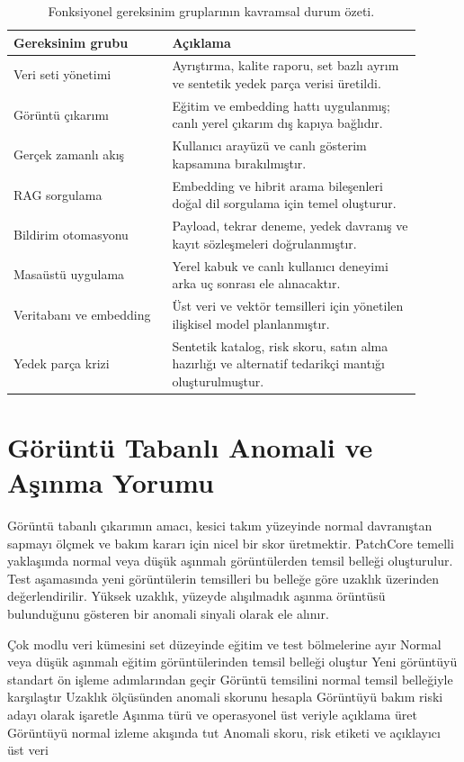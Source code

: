 \documentclass[conference]{IEEEtran}
\begin{document}
\begin{table}[H]
\centering
\caption{Fonksiyonel gereksinim gruplarının kavramsal durum özeti.}
\label{tab:reqstatus}
\begin{tabular}{p{0.35\linewidth}p{0.55\linewidth}}
\toprule
Gereksinim grubu & Açıklama \\
\midrule
Veri seti yönetimi & Ayrıştırma, kalite raporu, set bazlı ayrım ve sentetik yedek parça verisi üretildi. \\
Görüntü çıkarımı & Eğitim ve embedding hattı uygulanmış; canlı yerel çıkarım dış kapıya bağlıdır. \\
Gerçek zamanlı akış & Kullanıcı arayüzü ve canlı gösterim kapsamına bırakılmıştır. \\
RAG sorgulama & Embedding ve hibrit arama bileşenleri doğal dil sorgulama için temel oluşturur. \\
Bildirim otomasyonu & Payload, tekrar deneme, yedek davranış ve kayıt sözleşmeleri doğrulanmıştır. \\
Masaüstü uygulama & Yerel kabuk ve canlı kullanıcı deneyimi arka uç sonrası ele alınacaktır. \\
Veritabanı ve embedding & Üst veri ve vektör temsilleri için yönetilen ilişkisel model planlanmıştır. \\
Yedek parça krizi & Sentetik katalog, risk skoru, satın alma hazırlığı ve alternatif tedarikçi mantığı oluşturulmuştur. \\
\bottomrule
\end{tabular}
\end{table}

\section{Görüntü Tabanlı Anomali ve Aşınma Yorumu}
Görüntü tabanlı çıkarımın amacı, kesici takım yüzeyinde normal davranıştan sapmayı ölçmek ve bakım kararı için nicel bir skor üretmektir. PatchCore temelli yaklaşımda normal veya düşük aşınmalı görüntülerden temsil belleği oluşturulur. Test aşamasında yeni görüntülerin temsilleri bu belleğe göre uzaklık üzerinden değerlendirilir. Yüksek uzaklık, yüzeyde alışılmadık aşınma örüntüsü bulunduğunu gösteren bir anomali sinyali olarak ele alınır.

\begin{algorithm}[H]
\caption{Görüntü Tabanlı Anomali Değerlendirme Akışı}
\begin{algorithmic}[1]
\STATE Çok modlu veri kümesini set düzeyinde eğitim ve test bölmelerine ayır
\STATE Normal veya düşük aşınmalı eğitim görüntülerinden temsil belleği oluştur
\STATE Yeni görüntüyü standart ön işleme adımlarından geçir
\STATE Görüntü temsilini normal temsil belleğiyle karşılaştır
\STATE Uzaklık ölçüsünden anomali skorunu hesapla
  \STATE Görüntüyü bakım riski adayı olarak işaretle
  \STATE Aşınma türü ve operasyonel üst veriyle açıklama üret
\ELSE
  \STATE Görüntüyü normal izleme akışında tut
\ENDIF
\RETURN Anomali skoru, risk etiketi ve açıklayıcı üst veri
\end{algorithmic}
\end{algorithm}
\end{document}
